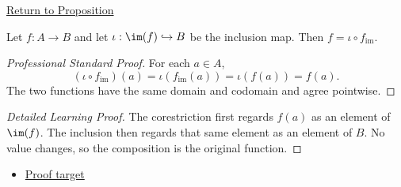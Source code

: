 \newpage
{}
\label{prf:image-factorization}

\begin{remark*}[Return]
\hyperref[prop:image-factorization]{Return to Proposition}
\end{remark*}

\begin{proposition*}
Let $f:A\to B$ and let $\iota:\im(f)\hookrightarrow B$ be the inclusion map.
Then $f=\iota\circ f_{\operatorname{im}}$.
\end{proposition*}

\begin{proof}[Professional Standard Proof]
\LRAProofBodyStart
For each $a\in A$,
\[
(\iota\circ f_{\operatorname{im}})(a)
=\iota(f_{\operatorname{im}}(a))
=\iota(f(a))
=f(a).
\]
The two functions have the same domain and codomain and agree pointwise.
\end{proof}

\begin{proof}[Detailed Learning Proof]
\LRAProofBodyStart
The corestriction first regards $f(a)$ as an element of $\im(f)$. The inclusion
then regards that same element as an element of $B$. No value changes, so the
composition is the original function.
\end{proof}
\begin{remark*}
\end{remark*}



\begin{dependencies}
\begin{itemize}
  \item \hyperref[prop:image-factorization]{Proof target}
\end{itemize}
\end{dependencies}

\clearpage

